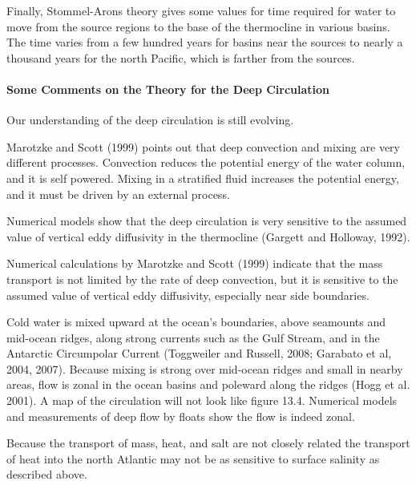 Finally, Stommel-Arons theory gives some values for time required for
water to move from the source regions to the base of the
thermocline in various basins. The time varies from
a few hundred years for basins near the sources to nearly a thousand
years for the north Pacific, which is farther from the
sources.

\paragraph{Some Comments on the Theory for the Deep Circulation} Our understanding of the deep circulation is still evolving.
\begin{enumerate}
\vitem Marotzke and Scott (1999) points out that deep convection and
mixing are very different
processes. Convection reduces the potential energy of the water
column, and it is self powered. Mixing in a stratified fluid increases
the potential energy, and it must be driven by an external process.

\vitem Numerical models show that the deep circulation is very
sensitive to the assumed value of vertical eddy diffusivity in the
thermocline (Gargett and
Holloway, 1992).

\vitem Numerical calculations by Marotzke and Scott (1999) indicate
that the mass transport is not limited by the
rate of deep convection, but it is sensitive to the assumed value of
vertical eddy diffusivity, especially near side boundaries.

\vitem Cold water is mixed upward at the ocean's boundaries, above
seamounts and mid-ocean ridges, along
strong currents such as the Gulf Stream, and in the Antarctic Circumpolar Current (Toggweiler and
Russell, 2008; Garabato et al, 2004, 2007). Because mixing is strong
over mid-ocean ridges and small in nearby areas, flow is zonal in the
ocean basins and poleward along the ridges (Hogg et al. 2001). A map
of the circulation will not look like figure 13.4. Numerical
models and measurements of
deep flow by floats show the flow is indeed zonal.

\vitem Because the transport of mass, heat, and salt are not closely
related the transport of heat into the north Atlantic may not be as
sensitive to surface salinity as described above.
\end{enumerate}

